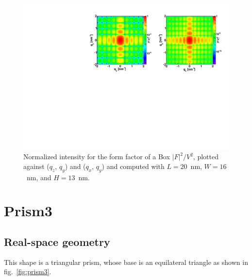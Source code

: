\begin{figure}[h]
\begin{center}
\includegraphics[width=\textwidth]{Figures/figffbox}
\end{center}
\caption{Normalized intensity for the form factor of a Box
  $|F|^2/V^2$, plotted against ($q_z$, $q_y$) and  ($q_x$, $q_y$) and computed with $L=20$~nm, $W=16$~nm, and $H=13$~nm.}
\label{fig:FFBoxEx}
\end{figure}

\FloatBarrier


\newpage{\cleardoublepage}
\section{Prism3} 
 
\subsection{Real-space geometry}
This shape is a triangular prism, whose base is an equilateral
triangle as shown in fig.~\ref{fig:prism3}.

